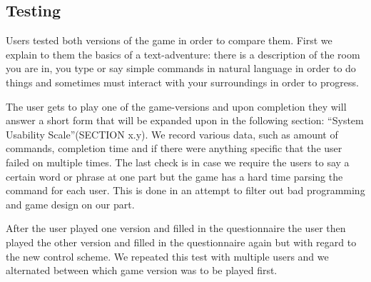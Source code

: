 \subsection{Testing}
Users tested both versions of the game in order to compare them. First we explain to them the basics of a text-adventure: there is a description of the room you are in, you type or say simple commands in natural language in order to do things and sometimes must interact with your surroundings in order to progress. 

The user gets to play one of the game-versions and upon completion they will answer a short form that will be expanded upon in the following section: “System Usability Scale”(SECTION x.y). We record various data, such as amount of commands, completion time and if there were anything specific that the user failed on multiple times. The last check is in case we require the users to say a certain word or phrase at one part but the game has a hard time parsing the command for each user. This is done in an attempt to filter out bad programming and game design on our part.

After the user played one version and filled in the questionnaire the user then played the other version and filled in the questionnaire again but with regard to the new control scheme. We repeated this test with multiple users and we alternated between which game version was to be played first.